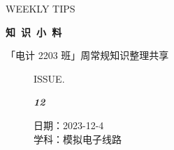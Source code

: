 \documentclass[UTF8]{ctexart}
\newcommand\Black[1]{\textcolor[gray]{0.3}{#1}}
\newcommand\Brown[1]{\textcolor[HTML]{998A4E}{#1}}
\newcommand\IssueNumber{12}
\newcommand\Date{2023-12-4}
\newcommand\Subject{模拟电子线路}
\begin{document}
\BgThispage
\begin{center}
{\scriptsize\Issue \textcolor[HTML]{C8BA83}{WEEKLY TIPS}}

{\Huge\bfseries\TitleFont \Black{知\ 识\ 小\ 料}}

\vspace{-0.1cm}
{\footnotesize \Brown{「电计 2203 班」周常规知识整理共享}}
\end{center}

\vspace{-0.5cm}

\begin{figure}[H]
\hspace{1cm}
\begin{minipage}[t]{0.3\textwidth}
\centering
    \Brown{ISSUE.}

    \vspace{-0.6cm}
    \Huge \Issue\slshape\bfseries\Black{\IssueNumber}
\end{minipage}
\hfill
\begin{minipage}[t]{0.3\textwidth}
\centering
    \Brown{日期：\Date} \\
\vspace{-0.1cm}
    \Brown{学科：\Subject} \\
\end{minipage}
\hspace{0.8cm}
\end{figure}
\end{document}
